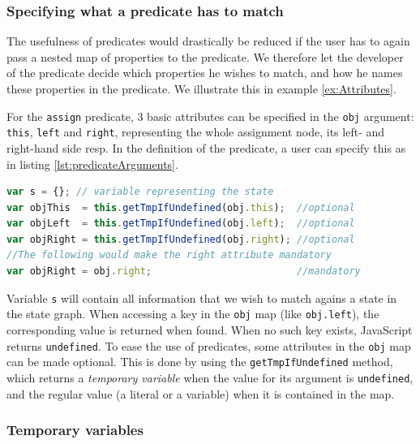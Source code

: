 \subsubsection*{Specifying what a predicate has to match} 

The usefulness of predicates would drastically be reduced if the user has to again pass a nested map of properties to the predicate. We therefore let the developer of the predicate decide which properties he wishes to match, and how he names these properties in the predicate. We illustrate this in example \ref{ex:Attributes}.

\begin{exmp}
\label{ex:Attributes}
For the \texttt{assign} predicate, 3 basic attributes can be specified in the \texttt{obj} argument: \texttt{this}, \texttt{left} and \texttt{right}, representing the whole assignment node, its left- and right-hand side resp. In the definition of the predicate, a user can specify this as in listing \ref{lst:predicateArguments}.

\begin{lstlisting}[label={lst:predicateArguments},language=JavaScript, caption=State properties of the \texttt{assign} predicate,mathescape=true]
var s = {}; // variable representing the state
var objThis  = this.getTmpIfUndefined(obj.this);  //optional
var objLeft  = this.getTmpIfUndefined(obj.left);  //optional
var objRight = this.getTmpIfUndefined(obj.right); //optional
//The following would make the right attribute mandatory 
var objRight = obj.right;                         //mandatory
\end{lstlisting}

Variable \texttt{s} will contain all information that we wish to match agains a state in the state graph.
When accessing a key in the \texttt{obj} map (like \texttt{obj.left}), the corresponding value is returned when found. When no such key exists, JavaScript returns \texttt{undefined}. To ease the use of predicates, some attributes in the \texttt{obj} map can be made optional. This is done by using the \texttt{getTmpIfUndefined} method, which returns a \textit{temporary variable} when the value for its argument is \texttt{undefined}, and the regular value (a literal or a variable) when it is contained in the map. 
\end{exmp}

\subsubsection*{Temporary variables}

